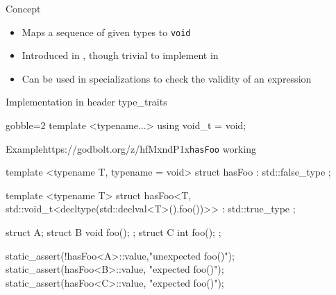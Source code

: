 \begin{frame}[fragile]
  \begin{block}{Concept}
    \begin{itemize}
    \item Maps a sequence of given types to \texttt{void}
    \item Introduced in , though trivial to implement in 
    \item Can be used in specializations to check the validity of an expression
    \end{itemize}
  \end{block}
  \begin{block}{Implementation in header type\_traits}
    \begin{cppcode*}{gobble=2}
      template <typename...>
      using void_t = void;
    \end{cppcode*}
  \end{block}
\end{frame}

\begin{frame}[fragile]
    \begin{exampleblockGB}{Example}{https://godbolt.org/z/hfMxndP1x}{\texttt{hasFoo} working}
      \begin{cppcode*}{}
      template <typename T, typename = void>
      struct hasFoo : std::false_type {};

      template <typename T>
      struct hasFoo<T,
         std::void_t<decltype(std::declval<T>().foo())>>
      : std::true_type {};

      struct A{}; struct B{ void foo(); };
      struct C{ int foo(); };

      static_assert(!hasFoo<A>::value,"unexpected foo()");
      static_assert(hasFoo<B>::value, "expected foo()");
      static_assert(hasFoo<C>::value, "expected foo()");
      \end{cppcode*}
    \end{exampleblockGB}
\end{frame}

